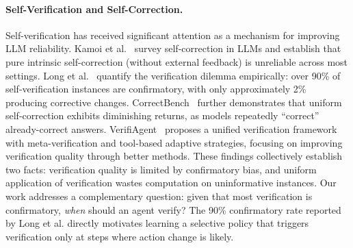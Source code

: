 \paragraph{Self-Verification and Self-Correction.}
Self-verification has received significant attention as a mechanism for improving LLM reliability. Kamoi et al.~\cite{kamoi2024self-correction-survey} survey self-correction in LLMs and establish that pure intrinsic self-correction (without external feedback) is unreliable across most settings. Long et al.~\cite{long2026selfverification} quantify the verification dilemma empirically: over 90\% of self-verification instances are confirmatory, with only approximately 2\% producing corrective changes. CorrectBench~\cite{tie2025correctbench} further demonstrates that uniform self-correction exhibits diminishing returns, as models repeatedly ``correct'' already-correct answers. VerifiAgent~\cite{verifiagent2025} proposes a unified verification framework with meta-verification and tool-based adaptive strategies, focusing on improving verification quality through better methods. These findings collectively establish two facts: verification quality is limited by confirmatory bias, and uniform application of verification wastes computation on uninformative instances. Our work addresses a complementary question: given that most verification is confirmatory, \textit{when} should an agent verify? The 90\% confirmatory rate reported by Long et al. directly motivates learning a selective policy that triggers verification only at steps where action change is likely.
